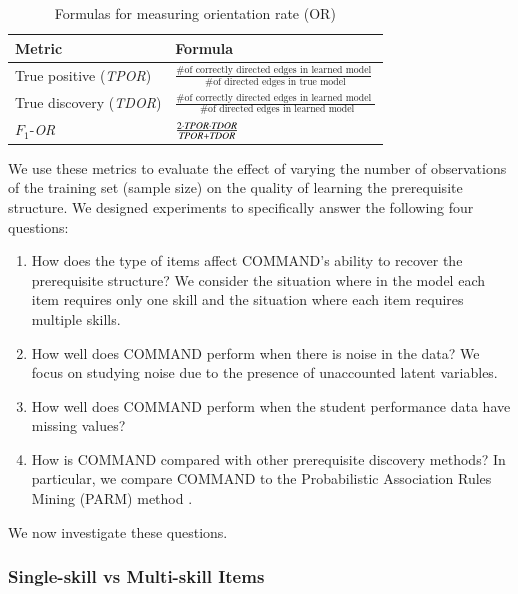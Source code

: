 \documentclass{edm_template}
\begin{document}
	
	\begin{table}[ht]
		\centering
		\caption{Formulas for measuring orientation rate (OR) \label{tbl:or}}
		\label{my-label}
		\begin{tabular}{@{}ll@{}}
			\toprule
			Metric & Formula \\ \midrule
			True positive  (\emph{TPOR}) & $\frac{ \text{\# of correctly directed edges in learned model} } {\text{ \# of directed edges in true model}}$  \\
			True discovery   (\emph{TDOR})& $\frac{ \text{\# of correctly directed edges in learned model } }{\text{ \# of directed edges in learned model}} $\\
			$F_1$-\textit{OR} &  $\frac{  2\cdot \text{\emph{TPOR}} \cdot \text{\emph{TDOR}} }{\text{\emph{TPOR}}+\text{\emph{TDOR}}}$ \\
			\bottomrule
		\end{tabular}
	\end{table}
	
	We use these metrics to evaluate the effect of varying the  number of observations  of the training set (sample size) on the quality of learning the prerequisite structure.
	We designed experiments to specifically answer the following four questions:
	\begin{enumerate}[noitemsep,topsep=2pt,parsep=0pt,partopsep=0pt]
		\item How does the type of items affect COMMAND's ability to recover the prerequisite structure?
		We consider the situation where in the model each item requires only one skill and the situation where each item requires multiple skills. 
		\item How well does COMMAND perform when there is noise in the data?
		We focus on studying noise due to the presence of unaccounted latent variables.
		\item How well does COMMAND perform when the student performance data have missing values?
		\item How is COMMAND compared with other prerequisite discovery methods?
		In particular, we compare COMMAND to the Probabilistic Association Rules Mining (PARM) method \cite{chen2015discovering}.
	\end{enumerate}
	We now investigate these questions.


	\subsubsection{Single-skill vs Multi-skill Items}
	
\end{document}
